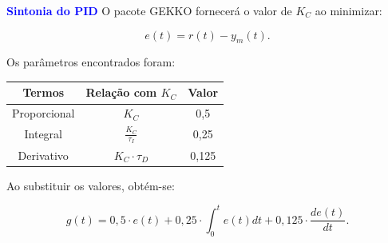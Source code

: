 \documentclass[aspectratio=169]{beamer}
\begin{document}

\begin{frame}{\textcolor{blue}{\textbf{Sintonia do PID}}}
\vspace*{-.6cm}
\justifying O pacote GEKKO \cite{gekko} fornecerá o valor de $K_C$ ao minimizar:

\begin{equation}
     e(t) = r(t) - y_m(t).
    \label{eq:erro}
\end{equation}

Os parâmetros encontrados foram:

 \begin{table}[H]
	\centering
	\vspace*{-0.05cm}
        \begin{tabular}{ccc} %
            \rowcolor{blue!30} Termos & Relação com $K_C$ & Valor \\
            \hline
            Proporcional & $K_C$ & 0,5 \\
            Integral & $\frac{K_C}{\tau_I}$ & 0,25 \\
            Derivativo & $K_C \cdot \tau_D$ & 0,125 \\
            \hline
        \end{tabular}
        \label{tab:outlunarlander}                 %
    \end{table}

\justifying Ao substituir os valores, obtém-se:

\begin{equation}
     g(t) = 0,5 \cdot e(t) + 0,25\cdot \int_0^t e(t) dt + 0,125 \cdot \frac{de(t)}{dt}.
    \label{eq:tempopidv}
\end{equation}

\end{frame}

\end{document}
